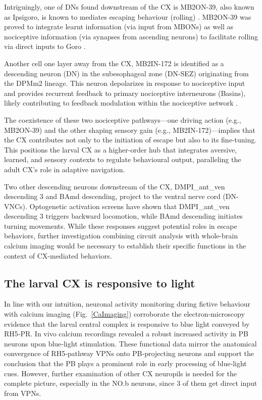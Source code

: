        Intriguingly, one of DNs found downstream of the CX is MB2ON-39, also known as Ipsigoro, is known to mediates escaping behaviour (rolling) \citep{jones2025descending}. MB2ON-39 was proved to integrate learnt information (via input from MBONs) as well as nociceptive information (via synapses from ascending neurons) to facilitate rolling via direct inputs to Goro \citep{burgos2018nociceptive}.  

        Another cell one layer away from the CX, MB2IN-172 is identified as a descending neuron (DN) in the subesophageal zone (DN-SEZ) originating from the DPMm2 lineage. This neuron depolarizes in response to nociceptive input and provides recurrent feedback to primary nociceptive interneurons (Basins), likely contributing to feedback modulation within the nociceptive network \citep{randel2025combining}. 

        The coexistence of these two nociceptive pathways—one driving action (e.g., MB2ON-39) and the other shaping sensory gain (e.g., MB2IN-172)—implies that the CX contributes not only to the initiation of escape but also to its fine‑tuning. This positions the larval CX as a higher‑order hub that integrates aversive, learned, and sensory contexts to regulate behavioural output, paralleling the adult CX’s role in adaptive navigation. 

        Two other descending neurons downstream of the CX, DMPI\_ant\_ven descending 3 and BAmd descending, project to the ventral nerve cord (DN-VNCs). Optogenetic activation screens have shown that DMPI\_ant\_ven descending 3 triggers backward locomotion, while BAmd descending initiates turning movements. While these responses suggest potential roles in escape behaviors, further investigation combining circuit analysis with whole-brain calcium imaging would be necessary to establish their specific functions in the context of CX-mediated behaviors.

        \subsection{The larval CX is responsive to light}

        In line with our intuition, neuronal activity monitoring during fictive behaviour with calcium imaging (Fig.~\ref{CaImaging}) corroborate the electron‑microscopy evidence that the larval central complex is responsive to blue light conveyed by RH5‑PR. In vivo calcium recordings revealed a robust increased activity in PB neurons upon blue‑light stimulation. These functional data mirror the anatomical convergence of RH5‑pathway VPNs onto PB‑projecting neurons and support the conclusion that the PB plays a prominent role in early processing of blue‑light cues. However, further examination of other CX neuropils is needed for the complete picture, especially in the NO.b neurons, since 3 of them get direct input from VPNs. 
        
